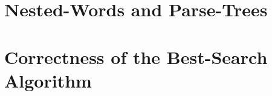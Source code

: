 




\newpage
\appendix


\section{Nested-Words and Parse-Trees} \label{sec:trees}



\section{Correctness of the Best-Search Algorithm} \label{sec:bestsearch}



\newpage
\listoftodos



